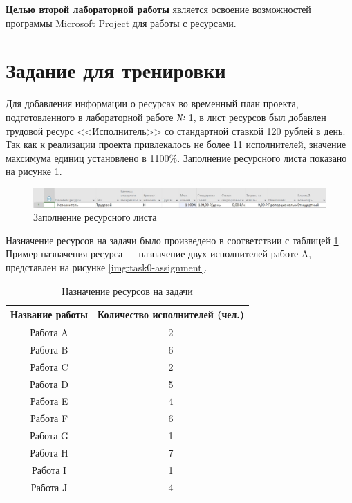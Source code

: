 \textbf{Целью второй лабораторной работы} является освоение возможностей программы Microsoft Project для работы с ресурсами.

\section*{Задание для тренировки}

Для добавления информации о ресурсах во временный план проекта, подготовленного в лабораторной работе № 1, в лист ресурсов был добавлен трудовой ресурс <<Исполнитель>> со стандартной ставкой 120 рублей в день. Так как к реализации проекта привлекалось не более 11 исполнителей, значение максимума единиц установлено в 1100\%. Заполнение ресурсного листа показано на рисунке \ref{img:task0-executor}.

\begin{figure}[H]
	\begin{center}
		\includegraphics[scale=0.45]{inc/img/task0-executor.jpg}
	\end{center}
	\captionsetup{justification=centering}
	\caption{Заполнение ресурсного листа}
	\label{img:task0-executor}
\end{figure}

Назначение ресурсов на задачи было произведено в соответствии с таблицей \ref{tab:tasks}. Пример назначения ресурса --- назначение двух исполнителей работе A, представлен на рисунке \ref{img:task0-assignment}. 

\begin{table}[h]
    \caption{Назначение ресурсов на задачи}\vspace{-0.5cm}\fontsize{12pt}{12pt}\selectfont
    \begin{center}
        \begin{tabular}{|c|c|}
        		\hline
            \textbf{Название работы} & 
            \textbf{Количество исполнителей (чел.)} \\ \hline
            Работа A & 2 \\ \hline
            Работа B & 6 \\ \hline
            Работа C & 2 \\ \hline
            Работа D & 5 \\ \hline
            Работа E & 4 \\ \hline
            Работа F & 6 \\ \hline
            Работа G & 1 \\ \hline
            Работа H & 7 \\ \hline
            Работа I & 1 \\ \hline
            Работа J & 4 \\ \hline
        \end{tabular}
    \end{center}
    \label{tab:tasks}
\end{table}

